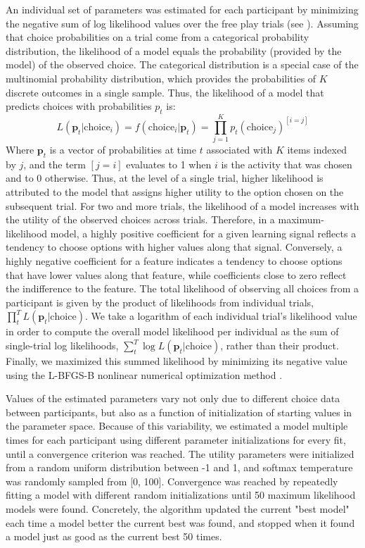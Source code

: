     An individual set of parameters was estimated  for each participant  by minimizing the negative sum of log likelihood values over the free play trials (see \cite{daw2011trial}). Assuming that choice probabilities on a trial come from a categorical probability distribution, the likelihood of a model equals the probability (provided by the model) of the observed choice. The categorical distribution is a special case of the multinomial probability distribution, which provides the probabilities of $K$ discrete outcomes in a single sample. Thus, the likelihood of a model that predicts choices with probabilities $p_t$ is:
    \begin{equation}\label{eq:likelihood}
        L(\textbf{p}_t \vert \text{choice}_i) = f(\text{choice}_i \vert \textbf{p}_t) = \prod_{j=1}^{K} p_t(\text{choice}_j)^{[i=j]}
    \end{equation}
    Where $\textbf{p}_t$ is a vector of probabilities at time $t$ associated with $K$ items indexed by $j$, and the term $[j = i]$ evaluates to 1 when $i$ is the activity that was chosen and to 0 otherwise. Thus, at the level of a single trial, higher likelihood is attributed to the model that assigns higher utility to the option chosen on the subsequent trial. For two and more trials, the likelihood of a model increases with the utility of the observed choices across trials. Therefore, in a maximum-likelihood model, a highly positive coefficient for a given learning signal reflects a tendency to choose options with higher values along that signal. Conversely, a highly negative coefficient for a feature indicates a tendency to choose options that have lower values along that feature, while coefficients close to zero reflect the indifference to the feature. The total likelihood of observing all choices from a participant is given by the product of likelihoods from individual trials, $\prod_t^T L(\textbf{p}_t \vert \text{choice})$. We take a logarithm of each individual trial's likelihood value in order to compute the overall model likelihood per individual as the sum of single-trial log likelihoods, $\sum_t^T \log L(\textbf{p}_t \vert \text{choice})$, rather than their product. Finally, we maximized this summed likelihood by minimizing its negative value using the L-BFGS-B nonlinear numerical optimization method \cite{byrd1995limited}.
     
    Values of the estimated parameters vary not only due to different choice data between participants, but also as a function of initialization of starting values in the parameter space. Because of this variability, we estimated a model multiple times for each participant using different parameter initializations for every fit, until a convergence criterion was reached. The utility parameters were initialized from a random uniform distribution between -1 and 1, and softmax temperature was randomly sampled from [0, 100]. Convergence was reached by repeatedly fitting a model with different random initializations until 50 maximum likelihood models were found. Concretely, the algorithm updated the current "best model" each time a model better the current best was found, and stopped when it found a model just as good as the current best 50 times.
    
